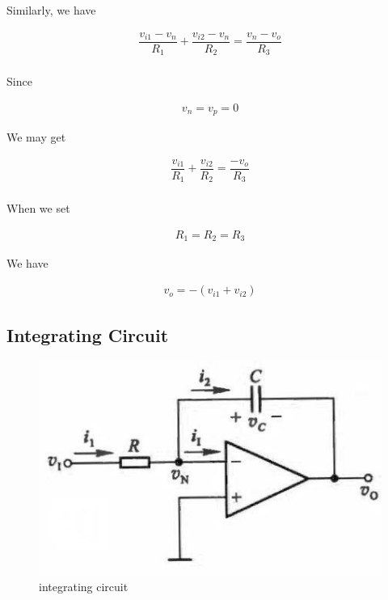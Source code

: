 Similarly, we have

\begin{equation*}
  \begin{aligned}
    \dfrac{v_{i1} - v_n}{R_1} + \dfrac{v_{i2}- v_n}{R_2} = \dfrac{v_n - v_o}{R_3} \\
  \end{aligned}
\end{equation*}

Since

\begin{equation*}
  \begin{aligned}
    v_n= v_p = 0
  \end{aligned}
\end{equation*}

We may get

\begin{equation*}
  \begin{aligned}
    \dfrac{v_{i1}}{R_1} + \dfrac{v_{i2}}{R_2} = \dfrac{- v_o}{R_3} \\
  \end{aligned}
\end{equation*}

When we set

\begin{equation*}
  \begin{aligned}
    R_1 = R_2 = R_3
  \end{aligned}
\end{equation*}

We have

\begin{equation*}
  \begin{aligned}
    v_o = - \left( v_{i1} + v_{i2} \right)
  \end{aligned}
\end{equation*}

\subsection{Integrating Circuit}

\begin{figure}[H]
  \centering
  \includegraphics[width=0.4\linewidth]{figures/integrating-circuit}
  \caption{integrating circuit}
  \label{fig:}
\end{figure}

